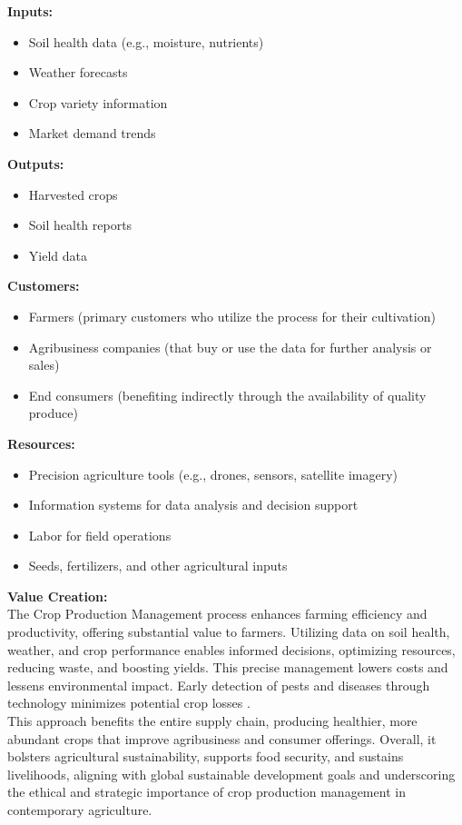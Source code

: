 \documentclass[12pt,a4paper]{article}
\begin{document}
\textbf{Inputs:}
\begin{itemize}
    \item Soil health data (e.g., moisture, nutrients)
    \item Weather forecasts
    \item Crop variety information
    \item Market demand trends
\end{itemize}
\textbf{Outputs:}
\begin{itemize}
    \item Harvested crops
    \item Soil health reports
    \item Yield data
\end{itemize}
\textbf{Customers:}
\begin{itemize}
    \item Farmers (primary customers who utilize the process for their cultivation)
    \item Agribusiness companies (that buy or use the data for further analysis or sales)
    \item End consumers (benefiting indirectly through the availability of quality produce)
\end{itemize}
\textbf{Resources:}
\begin{itemize}
    \item Precision agriculture tools (e.g., drones, sensors, satellite imagery)
    \item Information systems for data analysis and decision support
    \item Labor for field operations
    \item Seeds, fertilizers, and other agricultural inputs
\end{itemize}
\textbf{Value Creation:}\\
\noindent The Crop Production Management process enhances farming efficiency and productivity, offering substantial value to farmers. Utilizing data on soil health, weather, and crop performance enables informed decisions, optimizing resources, reducing waste, and boosting yields. This precise management lowers costs and lessens environmental impact. Early detection of pests and diseases through technology minimizes potential crop losses \citep{Ref_6}.
\\

\noindent This approach benefits the entire supply chain, producing healthier, more abundant crops that improve agribusiness and consumer offerings. Overall, it bolsters agricultural sustainability, supports food security, and sustains livelihoods, aligning with global sustainable development goals and underscoring the ethical and strategic importance of crop production management in contemporary agriculture.
\end{document}
